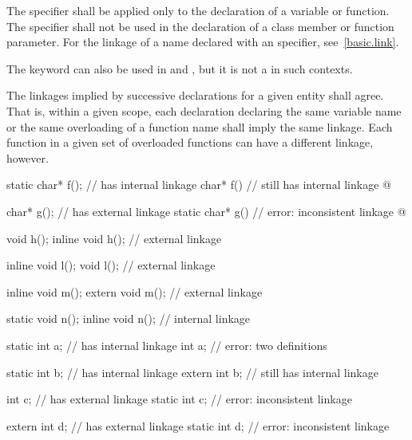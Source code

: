 \pnum
{}%
The  specifier shall be applied only to the declaration of a variable
or function. The  specifier shall not be used in the
declaration of a class member or function parameter.
%
%
For the linkage of a name declared with an  specifier,
see~\ref{basic.link}.
\begin{note}
The  keyword can also be used in
 and
, but it is not a
 in such contexts.
\end{note}

\pnum
The linkages implied by successive declarations for a given entity shall
agree. That is, within a given scope, each declaration declaring the
same variable name or the same overloading of a function name shall imply
the same linkage. Each function in a given set of overloaded functions
can have a different linkage, however.
\begin{example}
\begin{codeblock}
static char* f();               //  has internal linkage
char* f()                       //  still has internal linkage
  { @\commentellip@ }

char* g();                      //  has external linkage
static char* g()                // error: inconsistent linkage
  { @\commentellip@ }

void h();
inline void h();                // external linkage

inline void l();
void l();                       // external linkage

inline void m();
extern void m();                // external linkage

static void n();
inline void n();                // internal linkage

static int a;                   //  has internal linkage
int a;                          // error: two definitions

static int b;                   //  has internal linkage
extern int b;                   //  still has internal linkage

int c;                          //  has external linkage
static int c;                   // error: inconsistent linkage

extern int d;                   //  has external linkage
static int d;                   // error: inconsistent linkage
\end{codeblock}
\end{example}

